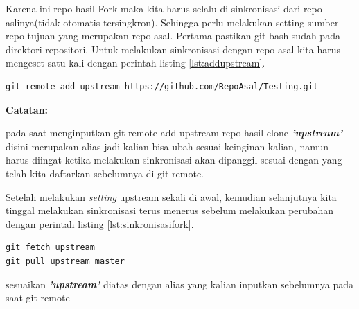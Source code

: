 Karena ini repo hasil Fork maka kita harus selalu di sinkronisasi dari repo aslinya(tidak otomatis tersingkron). Sehingga perlu melakukan setting sumber repo tujuan yang merupakan repo asal. Pertama pastikan git bash sudah pada direktori repositori. Untuk melakukan sinkronisasi dengan repo asal kita harus mengeset satu kali dengan perintah listing \ref{lst:addupstream}.

\begin{lstlisting}[caption=Set Repo Asal Sebagai Upstream,label={lst:addupstream}]
git remote add upstream https://github.com/RepoAsal/Testing.git
\end{lstlisting}

\par \textbf{Catatan:} 
\par pada saat menginputkan git remote add upstream repo hasil clone \textbf{\textit{'upstream'}} disini merupakan alias jadi kalian bisa ubah sesuai keinginan kalian, namun harus diingat ketika melakukan sinkronisasi akan dipanggil sesuai dengan yang telah kita daftarkan sebelumnya di git remote.

\par Setelah melakukan \textit{setting} upstream sekali di awal, kemudian selanjutnya kita tinggal melakukan sinkronisasi terus menerus sebelum melakukan perubahan dengan perintah listing \ref{lst:sinkronisasifork}.

\begin{lstlisting}[caption=Perintah Sinkronisasi dengan repo asal,label={lst:sinkronisasifork}]
git fetch upstream
git pull upstream master
\end{lstlisting}

 sesuaikan \textbf{\textit{'upstream'}} diatas dengan alias yang kalian inputkan sebelumnya pada saat git remote 

